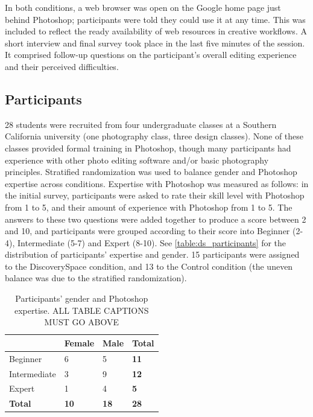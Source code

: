 In both conditions, a web browser was open on the Google home page just behind Photoshop; participants were told they could use it at any time. This was included to reflect the ready availability of web resources in creative workflows. A short interview and final survey took place in the last five minutes of the session. It comprised follow-up questions on the participant's overall editing experience and their perceived difficulties. 

\subsection{Participants}
28 students were recruited from four undergraduate classes at a Southern California university (one photography class, three design classes). None of these classes provided formal training in Photoshop, though many participants had experience with other photo editing software and/or basic photography principles. Stratified randomization was used to balance gender and Photoshop expertise across conditions. Expertise with Photoshop was measured as follows: in the initial survey, participants were asked to rate their skill level with Photoshop from 1 to 5, and their amount of experience with Photoshop from 1 to 5. The answers to these two questions were added together to produce a score between 2 and 10, and participants were grouped according to their score into Beginner (2-4), Intermediate (5-7) and Expert (8-10). See \autoref{table:ds_participants} for the distribution of participants' expertise and gender. 15 participants were assigned to the Discovery\-Space condition, and 13 to the Control condition (the uneven balance was due to the stratified randomization).

\begin{table}[]
\centering
\begin{tabular}{l|lll}
 & Female & Male & \textbf{Total} \\ \hline
Beginner & 6 & 5 & \textbf{11} \\
Intermediate & 3 & 9 & \textbf{12} \\
Expert & 1 & 4 & \textbf{5} \\
\textbf{Total} & \textbf{10} & \textbf{18} & \textbf{28}
\end{tabular}
\caption{Participants' gender and Photoshop expertise. ALL TABLE CAPTIONS MUST GO ABOVE}~\label{table:ds_participants}
\end{table}

